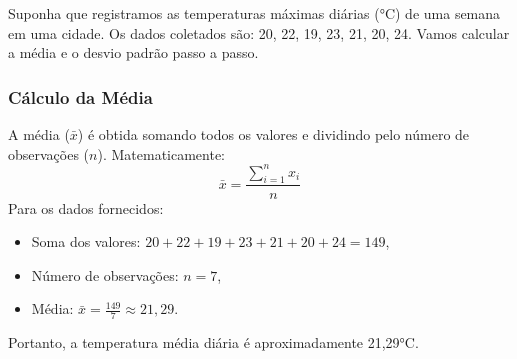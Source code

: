 \documentclass[a4paper,12pt,openany]{book}
\begin{document}
Suponha que registramos as temperaturas máximas diárias (°C) de uma semana em uma cidade. Os dados coletados são: 20, 22, 19, 23, 21, 20, 24. Vamos calcular a média e o desvio padrão passo a passo.

\subsubsection{Cálculo da Média}
A média (\(\bar{x}\)) é obtida somando todos os valores e dividindo pelo número de observações (\(n\)). Matematicamente:
\begin{equation}
\bar{x} = \frac{\sum_{i=1}^{n} x_i}{n}
\end{equation}
Para os dados fornecidos:
\begin{itemize}
    \item Soma dos valores: \(20 + 22 + 19 + 23 + 21 + 20 + 24 = 149\),
    \item Número de observações: \(n = 7\),
    \item Média: \(\bar{x} = \frac{149}{7} \approx 21,29\).
\end{itemize}
Portanto, a temperatura média diária é aproximadamente 21,29°C.
\end{document}
